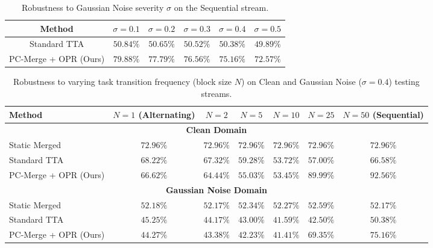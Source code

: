 \documentclass{article}
\theoremstyle{plain}
\theoremstyle{definition}
\theoremstyle{remark}
\begin{document}
\begin{table}[t]
\caption{Robustness to Gaussian Noise severity $\sigma$ on the Sequential stream.}
\label{tab:noise_severity_sweep}
\vskip 0.1in
\begin{center}
\begin{small}
\scshape
\begin{tabular}{cccccc}
\toprule
Method & $\sigma=0.1$ & $\sigma=0.2$ & $\sigma=0.3$ & $\sigma=0.4$ & $\sigma=0.5$ \\
\midrule
Standard TTA & $50.84\%$ & $50.65\%$ & $50.52\%$ & $50.38\%$ & $49.89\%$ \\
PC-Merge + OPR (Ours) & $79.88\%$ & $77.79\%$ & $76.56\%$ & $75.16\%$ & $72.57\%$ \\
\bottomrule
\end{tabular}
\end{small}
\end{center}
\vskip -0.1in
\end{table}

\begin{table}[t]
\caption{Robustness to varying task transition frequency (block size $N$) on Clean and Gaussian Noise ($\sigma=0.4$) testing streams.}
\label{tab:frequency_sweep}
\vskip 0.1in
\begin{center}
\begin{small}
\scshape
\begin{tabular}{lcccccc}
\toprule
Method & $N=1$ (Alternating) & $N=2$ & $N=5$ & $N=10$ & $N=25$ & $N=50$ (Sequential) \\
\midrule
\multicolumn{7}{c}{\textbf{Clean Domain}} \\
\midrule
Static Merged & $72.96\%$ & $72.96\%$ & $72.96\%$ & $72.96\%$ & $72.96\%$ & $72.96\%$ \\
Standard TTA & $68.22\%$ & $67.32\%$ & $59.28\%$ & $53.72\%$ & $57.00\%$ & $66.58\%$ \\
PC-Merge + OPR (Ours) & $66.62\%$ & $64.44\%$ & $55.03\%$ & $53.45\%$ & $\mathbf{89.99\%}$ & $\mathbf{92.56\%}$ \\
\midrule
\multicolumn{7}{c}{\textbf{Gaussian Noise Domain}} \\
\midrule
Static Merged & $\mathbf{52.18\%}$ & $\mathbf{52.17\%}$ & $\mathbf{52.34\%}$ & $\mathbf{52.27\%}$ & $52.59\%$ & $52.17\%$ \\
Standard TTA & $45.25\%$ & $44.17\%$ & $43.00\%$ & $41.59\%$ & $42.50\%$ & $50.38\%$ \\
PC-Merge + OPR (Ours) & $44.27\%$ & $43.38\%$ & $42.23\%$ & $41.41\%$ & $\mathbf{69.35\%}$ & $\mathbf{75.16\%}$ \\
\bottomrule
\end{tabular}
\end{small}
\end{center}
\vskip -0.1in
\end{table}
\end{document}
